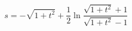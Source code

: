 \begin{equation}
s=-\sqrt{1+t^{2}}+\frac{1}{2}\ln \frac{\sqrt{1+t^{2}}+1}{\sqrt{1+t^{2}}-1}\,
\label{tortoise}
\end{equation}

